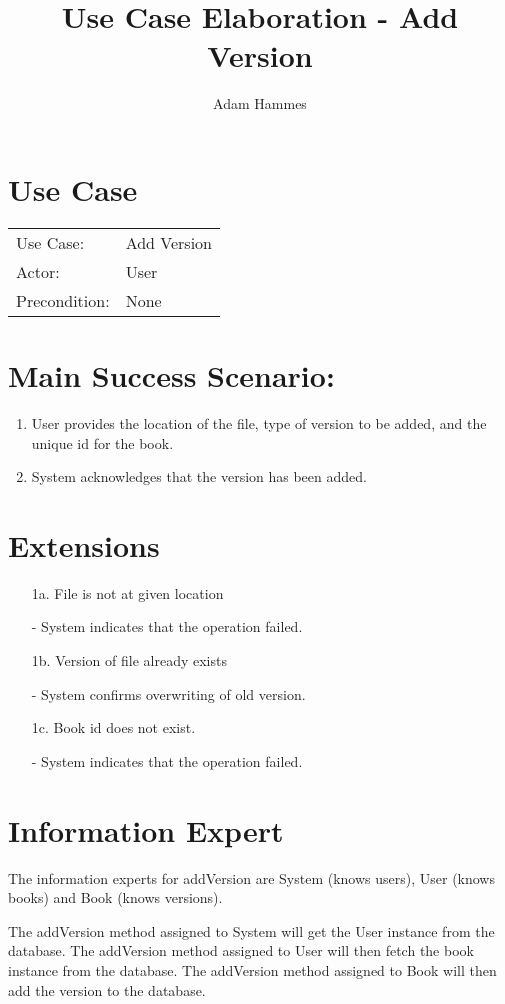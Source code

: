 \documentclass{article}
\title{Use Case Elaboration - Add Version}
\author{Adam Hammes}
\begin{document}
\maketitle

\section*{Use Case}

\begin{tabular}{l l}
  Use Case:     & Add Version \\
  Actor:        & User        \\
  Precondition: & None        \\
\end{tabular}

\section*{Main Success Scenario:}

\begin{enumerate}
  \item User provides the location of the file, type of version
    to be added, and the unique id for the book.
  \item System acknowledges that the version has been added.
\end{enumerate}

\section*{Extensions}

\begin{enumerate}
  \item [1a.] File is not at given location

    - System indicates that the operation failed.

  \item [1b.] Version of file already exists

    - System confirms overwriting of old version.

  \item [1c.] Book id does not exist.

    - System indicates that the operation failed.
\end{enumerate}
\section*{Information Expert}

The information experts for addVersion are System (knows users), User (knows
books) and Book (knows versions).

The addVersion method assigned to System will get the User instance from the
database. The addVersion method assigned to User will then fetch the book
instance from the database. The addVersion method assigned to Book will then add
the version to the database.
\end{document}
